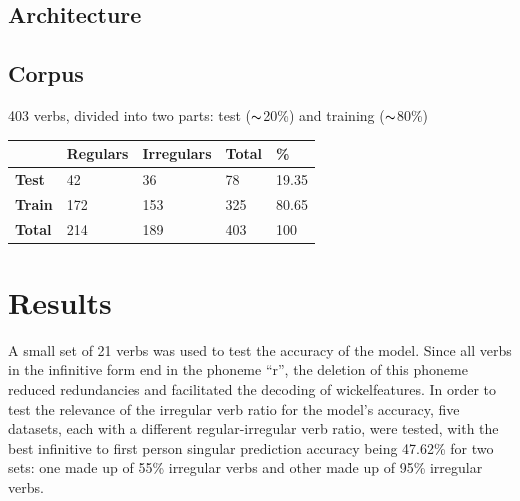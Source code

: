 \documentclass[a0,portrait]{a0poster}
\begin{document}
\begin{multicols}{2}

\color{DB}
\subsection*{Architecture}

\color{black}
\begin{center}

\end{center}
\color{DB}
\subsection*{Corpus}
\color{darkgray}
403 verbs, divided into two parts: test ($\thicksim$20\%) and training ($\thicksim$80\%)\vspace{1cm}

\begin{center}
\begin{minipage}{0.45\textwidth}\centering
\begin{tabular}{lllll}
\hline
 & \textbf{Regulars} & \textbf{Irregulars} & \textbf{Total} & \textbf{\%} \\ \hline
\textbf{Test} & 42 & 36 & 78 & 19.35 \\ \hline
\textbf{Train} & 172 & 153 & 325 & 80.65 \\ \hline
\textbf{Total} & 214 & 189 & 403 & 100 \\ \hline
\end{tabular}
\label{tab1}
\end{minipage}
\end{center}




\color{DB}
\section*{Results}
\color{darkgray}
	A small set of 21 verbs was used to test the accuracy of the model. Since all verbs in the infinitive form end in the phoneme “r”, the deletion of this phoneme reduced redundancies and facilitated the decoding of wickelfeatures. In order to test the relevance of the irregular verb ratio for the model’s accuracy, five datasets, each with a different regular-irregular verb ratio, were tested, with the best infinitive to first person singular prediction accuracy being 47.62\% for two sets: one made up of 55\% irregular verbs and other made up of 95\% irregular verbs.


\end{multicols}
\end{document}
